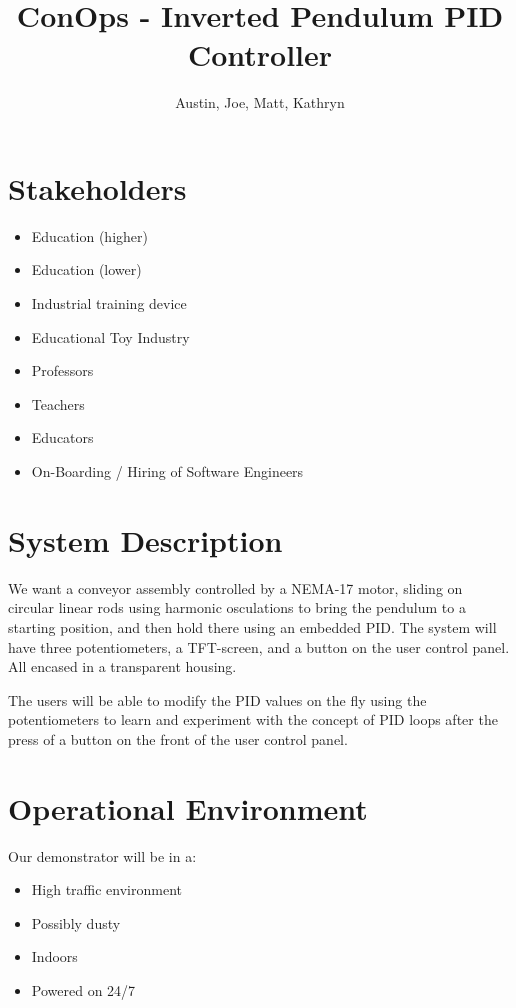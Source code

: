 \documentclass{article}
\title{ConOps - Inverted Pendulum PID Controller}       %
\author{Austin, Joe, Matt, Kathryn}                     %
\begin{document}


\section{Stakeholders}
\begin{itemize}           %
    \item Education (higher)
    \item Education (lower)
    \item Industrial training device
    \item Educational Toy Industry
\end{itemize}


\begin{itemize}
    \item Professors
    \item Teachers
    \item Educators
    \item On-Boarding / Hiring of Software Engineers
\end{itemize}




\section{System Description}

    We want a conveyor assembly controlled by a NEMA-17 motor, sliding on circular linear rods
    using harmonic osculations to bring the pendulum to a starting position, and then hold there
    using an embedded PID. The system will have three potentiometers, a TFT-screen, and a button on the user control panel. All encased in a transparent housing.


    The users will be able to modify the PID values on the fly using the potentiometers to learn and experiment
    with the concept of PID loops after the press of a button on the front of the user control panel.



\section{Operational Environment}

    Our demonstrator will be in a:
    \begin{itemize}
        \item High traffic environment
        \item Possibly dusty
        \item Indoors
        \item Powered on 24/7
    \end{itemize}
\end{document}
